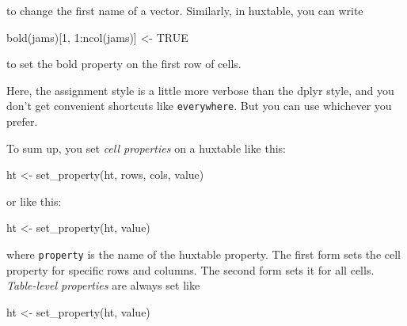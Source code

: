 \documentclass[
]{article}
\newenvironment{Shaded}{\begin{snugshade}}{\end{snugshade}}
\newcommand{\ConstantTok}[1]{\textcolor[rgb]{0.00,0.00,0.00}{#1}}
\newcommand{\DecValTok}[1]{\textcolor[rgb]{0.00,0.00,0.81}{#1}}
\newcommand{\FunctionTok}[1]{\textcolor[rgb]{0.00,0.00,0.00}{#1}}
\newcommand{\NormalTok}[1]{#1}
\newcommand{\OtherTok}[1]{\textcolor[rgb]{0.56,0.35,0.01}{#1}}
\newcommand{\SpecialCharTok}[1]{\textcolor[rgb]{0.00,0.00,0.00}{#1}}
\begin{document}
\FloatBarrier

to change the first name of a vector. Similarly, in huxtable, you can
write

\begin{Shaded}
\begin{Highlighting}[]
\FunctionTok{bold}\NormalTok{(jams)[}\DecValTok{1}\NormalTok{, }\DecValTok{1}\SpecialCharTok{:}\FunctionTok{ncol}\NormalTok{(jams)] }\OtherTok{\textless{}{-}} \ConstantTok{TRUE}
\end{Highlighting}
\end{Shaded}

\FloatBarrier

to set the bold property on the first row of cells.

Here, the assignment style is a little more verbose than the dplyr
style, and you don't get convenient shortcuts like \texttt{everywhere}.
But you can use whichever you prefer.

To sum up, you set \emph{cell properties} on a huxtable like this:

\begin{Shaded}
\begin{Highlighting}[]
\NormalTok{ht }\OtherTok{\textless{}{-}} \FunctionTok{set\_property}\NormalTok{(ht, rows, cols, value)}
\end{Highlighting}
\end{Shaded}

\FloatBarrier

or like this:

\begin{Shaded}
\begin{Highlighting}[]
\NormalTok{ht }\OtherTok{\textless{}{-}} \FunctionTok{set\_property}\NormalTok{(ht, value)}
\end{Highlighting}
\end{Shaded}

\FloatBarrier

where \texttt{property} is the name of the huxtable property. The first
form sets the cell property for specific rows and columns. The second
form sets it for all cells. \emph{Table-level properties} are always set
like

\begin{Shaded}
\begin{Highlighting}[]
\NormalTok{ht }\OtherTok{\textless{}{-}} \FunctionTok{set\_property}\NormalTok{(ht, value)}
\end{Highlighting}
\end{Shaded}
\end{document}
